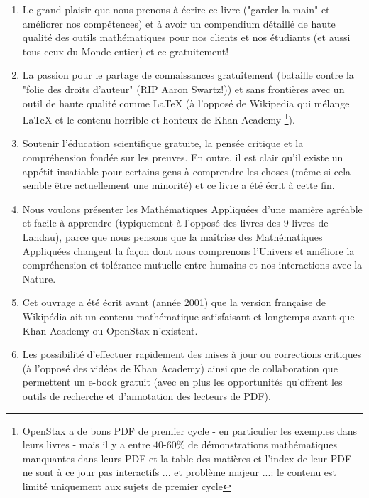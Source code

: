	\begin{enumerate}
		\item Le grand plaisir que nous prenons à écrire ce livre ("garder la main" et améliorer nos compétences) et à avoir un compendium détaillé de haute qualité des outils mathématiques pour nos clients et nos étudiants (et aussi tous ceux du Monde entier) et ce gratuitement!

		\item La passion pour le partage de connaissances gratuitement (bataille contre la "folie des droits d'auteur" (RIP Aaron Swartz!)) et sans frontières avec un outil de haute qualité comme \LaTeX{} (à l'opposé de Wikipedia qui mélange \LaTeX{} et le contenu horrible et honteux de Khan Academy \footnote{OpenStax a de bons PDF de premier cycle - en particulier les exemples dans leurs livres - mais il y a entre $40$-$60\%$ de démonstrations mathématiques manquantes dans leurs PDF et la table des matières et l'index de leur PDF ne sont à ce jour pas interactifs ... et problème majeur ...: le contenu est limité uniquement aux sujets de premier cycle}).
		
		\item Soutenir l'éducation scientifique gratuite, la pensée critique et la compréhension fondée sur les preuves. En outre, il est clair qu'il existe un appétit insatiable pour certains gens à comprendre les choses (même si cela semble être actuellement une minorité) et ce livre a été écrit à cette fin.
		
		\item Nous voulons présenter les Mathématiques Appliquées d'une manière agréable et facile à apprendre (typiquement à l'opposé des livres des $9$ livres de Landau), parce que nous pensons que la maîtrise des Mathématiques Appliquées changent la façon dont nous comprenons l'Univers et améliore la compréhension et tolérance mutuelle entre humains et nos interactions avec la Nature.
		
		\item Cet ouvrage a été écrit avant (année 2001) que la version française de Wikipédia ait un contenu mathématique satisfaisant et longtemps avant que Khan Academy ou OpenStax n'existent.

		\item Les possibilité d'effectuer rapidement des mises à jour ou corrections critiques  (à l'opposé des vidéos de Khan Academy) ainsi que de  collaboration que permettent un e-book gratuit (avec en plus les opportunités qu'offrent les outils de recherche et d'annotation des lecteurs de PDF).


\end{enumerate}
